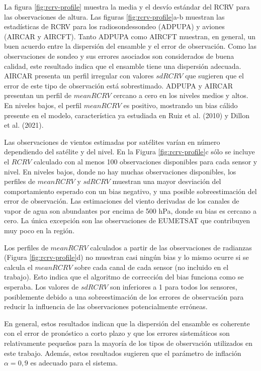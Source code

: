 \documentclass[12pt,oneside,a4paper]{reedthesis}
\begin{document}
La figura \ref{fig:rcrv-profile} muestra la media y el desvío estándar del RCRV para las observaciones de altura. Las figuras \ref{fig:rcrv-profile}a-b muestran las estadísticas de RCRV para los radiosondessondeo (ADPUPA) y aviones (AIRCAR y AIRCFT). Tanto ADPUPA como AIRCFT muestran, en general, un buen acuerdo entre la dispersión del ensamble y el error de observación. Como las observaciones de sondeo y sus errores asociados son considerados de buena calidad, este resultado indica que el ensamble tiene una dispersión adecuada. AIRCAR presenta un perfil irregular con valores \(sdRCRV\) que sugieren que el error de este tipo de observación está sobrestimado. ADPUPA y AIRCAR presentan un perfil de \(meanRCRV\) cercano a cero en los niveles medios y altos. En niveles bajos, el perfil \(meanRCRV\) es positivo, mostrando un bias cálido presente en el modelo, característica ya estudiada en Ruiz et al. (2010) y Dillon et al. (2021).

Las observaciones de vientos estimadas por satélites varían en número dependiendo del satélite y del nivel. En la Figura \ref{fig:rcrv-profile}c sólo se incluye el \(RCRV\) calculado con al menos 100 observaciones disponibles para cada sensor y nivel. En niveles bajos, donde no hay muchas observaciones disponibles, los perfiles de \(meanRCRV\) y \(sdRCRV\) muestran una mayor desviación del comportamiento esperado con un bias negativo, y una posible sobreestimación del error de observación. Las estimaciones del viento derivadas de los canales de vapor de agua son abundantes por encima de 500 hPa, donde su bias es cercano a cero. La única excepción son las observaciones de EUMETSAT que contribuyen muy poco en la región.

Los perfiles de \(meanRCRV\) calculados a partir de las observaciones de radianzas (Figura \ref{fig:rcrv-profile}d) no muestran casi ningún bias y lo mismo ocurre si se calcula el \(mean RCRV\) sobre cada canal de cada sensor (no incluido en el trabajo). Esto indica que el algoritmo de corrección del bias funciona como se esperaba. Los valores de \(sd RCRV\) son inferiores a 1 para todos los sensores, posiblemente debido a una sobreestimación de los errores de observación para reducir la influencia de las observaciones potencialmente erróneas.

En general, estos resultados indican que la dispersión del ensamble es coherente con el error de pronóstico a corto plazo y que los errores sistemáticos son relativamente pequeños para la mayoría de los tipos de observación utilizados en este trabajo. Además, estos resultados sugieren que el parámetro de inflación \(\alpha = 0,9\) es adecuado para el sistema.
\end{document}
